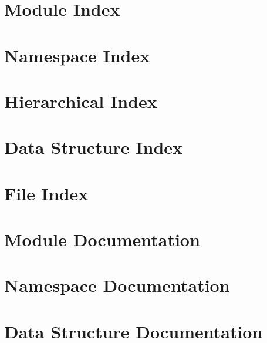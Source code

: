\let\mypdfximage\pdfximage\def\pdfximage{\immediate\mypdfximage}\documentclass[twoside]{book}
\newcommand{\+}{\discretionary{\mbox{\scriptsize$\hookleftarrow$}}{}{}}
\begin{document}
\chapter{Module Index}

\chapter{Namespace Index}

\chapter{Hierarchical Index}

\chapter{Data Structure Index}

\chapter{File Index}

\chapter{Module Documentation}
























\chapter{Namespace Documentation}

\chapter{Data Structure Documentation}


















\end{document}
